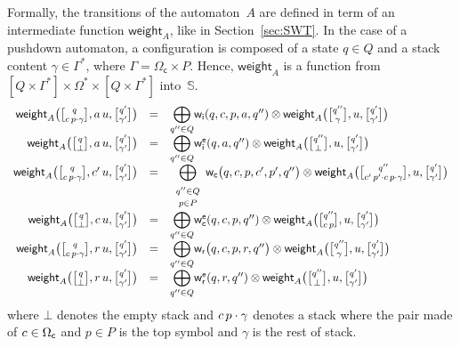 \documentclass[runningheads]{llncs}
\newcommand{\Semiring}{\mathbb{S}}
\def\weight{\mathsf{weight}}
\def\wei{\mathsf{w}}
\newcommand{\call}[1]{\ensuremath #1} %
\newcommand{\return}[1]{\ensuremath #1} %
\def\Omegac{{\Omega_\mathsf{c}}}
\def\weii{{\wei_\mathsf{i}}}
\def\weic{{\wei_\mathsf{c}}}
\def\weir{{\wei_\mathsf{r}}}
\def\weiei{{\wei^\mathsf{e}_\mathsf{i}}}
\def\weiec{{\wei^\mathsf{e}_\mathsf{c}}}
\def\weier{{\wei^\mathsf{e}_\mathsf{r}}}
\newcommand{\config}[2]{\ensuremath \genfrac{[}{]}{0pt}{}{#1}{#2}}
\begin{document}
Formally, the transitions of the automaton~$A$ are defined
in term of %
an intermediate function $\weight_A$, like in Section~\ref{sec:SWT}.
In the case of a pushdown automaton, a configuration is composed 
of a state $q \in Q$ and a stack content $\gamma \in \Gamma^*$, where $\Gamma = \Omegac \times P$.
Hence, $\weight_A$ is a function from 
$[Q \times \Gamma^*] \times \Omega^* \times [Q \times \Gamma^*]$ into~$\Semiring$.
%
\begin{equation}
\begin{array}[t]{rcl}
\weight_A\bigl(\config{q}{{\call{c}}\, p\cdot\gamma}, a\, u, \config{q'}{\gamma'}\bigr) & = & 
 {\displaystyle\bigoplus_{q'' \in Q}} \weii(q, c, p, a, q'') 
 \otimes \weight_A\bigl(\config{q''}{\gamma}, u, \config{q'}{\gamma'}\bigr)\\
\weight_A\bigl(\config{q}{\bot}, a\, u, \config{q'}{\gamma'}\bigr) & = & 
 {\displaystyle\bigoplus_{q'' \in Q}} \weiei(q, a, q'') 
 \otimes \weight_A\bigl(\config{q''}{\bot}, u, \config{q'}{\gamma'}\bigr)\\
%
\weight_A\bigl(\config{q}{{\call{c}}\, p\cdot\gamma}, {\call{c}'}\, u, \config{q'}{\gamma'}\bigr) & = & 
 {\displaystyle\bigoplus_{\begin{array}{c}
                          \scriptstyle q'' \in Q\\[-2pt]
                          \scriptstyle p \in P
                          \end{array}}}
 \weic\bigl(q, {\call{c}}, p, {\call{c}'}, p', q''\bigr) 
 \otimes \weight_A\bigl(\config{q''}{{\call{c}'}\, p' \cdot {\call{c}}\, p\cdot \gamma}, u, \config{q'}{\gamma'}\bigr)\\[1mm]
%
\weight_A\bigl(\config{q}{\bot}, {\call{c}}\, u, \config{q'}{\gamma'}\bigr) & = & 
 {\displaystyle\bigoplus_{q'' \in Q}} \weiec(q, {\call{c}}, p, q'') 
 \otimes \weight_A\bigl(\config{q''}{{\call{c}}\, p}, u, \config{q'}{\gamma'}\bigr)\\
%
\weight_A\bigl(\config{q}{{\call{c}}\, p\cdot \gamma}, {\return{r}}\, u, \config{q'}{\gamma'}\bigr) & = & 
 {\displaystyle\bigoplus_{q'' \in Q}} 
 \weir\bigl(q, {\call{c}}, p, {\return{r}}, q''\bigr) 
 \otimes \weight_A\bigl(\config{q''}{\gamma}, u, \config{q'}{\gamma'}\bigr)\\
%
\weight_A\bigl(\config{q}{\bot}, {\return{r}}\, u, \config{q'}{\gamma'}\bigr) & = & 
 {\displaystyle\bigoplus_{q'' \in Q}} \weier(q, {\return{r}}, q'') 
 \otimes \weight_A\bigl(\config{q''}{\bot}, u, \config{q'}{\gamma'}\bigr)\\
\end{array}
\label{eq:SWVPA-weight}
\end{equation}
%
where $\bot$ denotes the empty stack and ${\call{c}}\, p\cdot \gamma$ 
denotes a stack where the pair made of ${\call{c}} \in \Omegac$ and $p \in P$ is the top symbol 
and $\gamma$ is the rest of stack.
\end{document}
